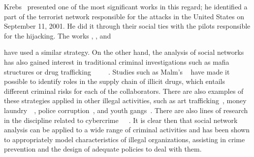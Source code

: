 Krebs~\cite{krebs2002mapping} presented one of the most significant works in this regard; he identified a part of the terrorist network responsible for the attacks in the United States on September 11, 2001. He did it through their social ties with the pilots responsible for the hijacking. The works \cite{medina2014social}, \cite{qin2005analyzing}, and {\cite{stollenwerk2016taking} have used a similar strategy. On the other hand, the analysis of social networks has also gained interest in traditional criminal investigations such as mafia structures or drug trafficking~\cite{bouchard2013advances}~\cite{bright2015use}~\cite{giommoni2017illicit}~\cite{morselli2009hells}~\cite{morselli2010assessing}. Studies such as Malm's ~\cite{malm2011networks} have made it possible to identify roles in the supply chain of illicit drugs, which entails different criminal risks for each of the collaborators. There are also examples of these strategies applied in other illegal activities, such as art trafficking~\cite{bichler2013small}, money laundry~\cite{colladon2017using}~\cite{soudijn2014using}, police corruption~\cite{lauchs2011corrupt}, and youth gangs~\cite{mcgloin2005policy}. There are also lines of research in the discipline related to cybercrime~\cite{decary2014information}~\cite{decary2012social}~\cite{decary2013reputation}. It is clear then that social network analysis can be applied to a wide range of criminal activities and has been shown to appropriately model characteristics of illegal organizations, assisting in crime prevention and the design of adequate policies to deal with them.

}
